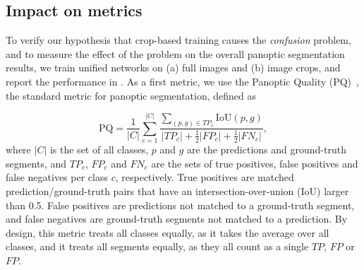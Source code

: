\documentclass[10pt,twocolumn,letterpaper]{article}
\begin{document}
 

\subsection{Impact on metrics}
\label{sec:problem_description:quantification}

To verify our hypothesis that crop-based training causes the \textit{confusion} problem, and to measure the effect of the problem on the overall panoptic segmentation results, we train unified networks on (a) full images and (b) image crops, and report the performance in . As a first metric, we use the Panoptic Quality (PQ)~\cite{kirillov2019ps}, the standard metric for panoptic segmentation, defined as

\noindent
\begin{equation}
\label{eq:pq_metric}
    \textrm{PQ} = \frac{1}{|C|} \sum_{c=1}^{|C|}\frac{\sum_{(p,g)\in{TP_c}}{\textrm{IoU}{(p,g)}}}{{|TP_c|}+\frac{1}{2}{|FP_c|}+\frac{1}{2}{|FN_c|}} ,
\end{equation}
where $|C|$ is the set of all classes, $p$ and $g$ are the predictions and ground-truth segments, and $TP_c$, $FP_c$ and $FN_c$ are the sets of true positives, false positives and false negatives per class $c$, respectively. True positives are matched prediction/ground-truth pairs that have an intersection-over-union (IoU) larger than 0.5. False positives are predictions not matched to a ground-truth segment, and false negatives are ground-truth segments not matched to a prediction. By design, this metric treats all classes equally, as it takes the average over all classes, and it treats all segments equally, as they all count as a single $TP$, $FP$ or $FP$.
\end{document}
